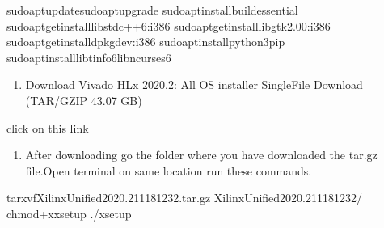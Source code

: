 \documentclass[letterpaper,10pt,english]{sphinxmanual}
\begin{document}
\begin{sphinxVerbatim}[commandchars=\\\{\}]
sudoaptupdatesudoaptupgrade
sudoaptinstallbuild\PYGZhy{}essential
sudoapt\PYGZhy{}getinstalllibstdc++6:i386
sudoapt\PYGZhy{}getinstalllibgtk2.0\PYGZhy{}0:i386
sudoapt\PYGZhy{}getinstalldpkg\PYGZhy{}dev:i386
sudoaptinstallpython3\PYGZhy{}pip
sudoaptinstalllibtinfo6libncurses6
\end{sphinxVerbatim}
\begin{enumerate}
%
\setcounter{enumi}{1}
\item {} 
\sphinxAtStartPar
Download Vivado HLx 2020.2: All OS installer Single\sphinxhyphen{}File Download (TAR/GZIP \sphinxhyphen{} 43.07 GB)

\end{enumerate}

\sphinxAtStartPar
click on this link 

\begin{figure}[htbp]
\centering

\noindent{}
\end{figure}
\begin{enumerate}
%
\setcounter{enumi}{2}
\item {} 
\sphinxAtStartPar
After downloading go the folder where you have downloaded the tar.gz file.Open terminal on same location run these commands.

\end{enumerate}

\begin{sphinxVerbatim}[commandchars=\\\{\}]
tar\PYGZhy{}xvfXilinx\PYGZus{}Unified\PYGZus{}2020.2\PYGZus{}1118\PYGZus{}1232.tar.gz
Xilinx\PYGZus{}Unified\PYGZus{}2020.2\PYGZus{}1118\PYGZus{}1232/
chmod+xxsetup
./xsetup
\end{sphinxVerbatim}



\renewcommand{\indexname}{Index}
\printindex
\end{document}
